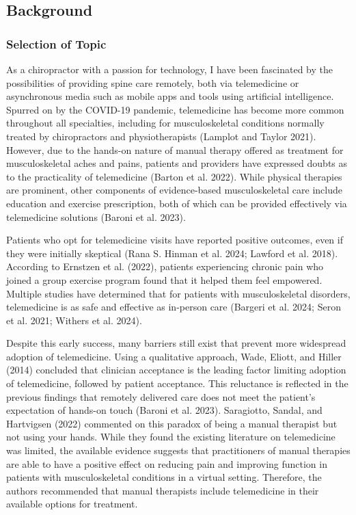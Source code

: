 \documentclass[
  letterpaper,
]{article}
\begin{document}
\subsection{Background}\label{background}

\subsubsection{Selection of Topic}\label{selection-of-topic}

As a chiropractor with a passion for technology, I have been fascinated
by the possibilities of providing spine care remotely, both via
telemedicine or asynchronous media such as mobile apps and tools using
artificial intelligence. Spurred on by the COVID-19 pandemic,
telemedicine has become more common throughout all specialties,
including for musculoskeletal conditions normally treated by
chiropractors and physiotherapists (Lamplot and Taylor 2021). However,
due to the hands-on nature of manual therapy offered as treatment for
musculoskeletal aches and pains, patients and providers have expressed
doubts as to the practicality of telemedicine (Barton et al. 2022).
While physical therapies are prominent, other components of
evidence-based musculoskeletal care include education and exercise
prescription, both of which can be provided effectively via telemedicine
solutions (Baroni et al. 2023).

Patients who opt for telemedicine visits have reported positive
outcomes, even if they were initially skeptical (Rana S. Hinman et al.
2024; Lawford et al. 2018). According to Ernstzen et al. (2022),
patients experiencing chronic pain who joined a group exercise program
found that it helped them feel empowered. Multiple studies have
determined that for patients with musculoskeletal disorders,
telemedicine is as safe and effective as in-person care (Bargeri et al.
2024; Seron et al. 2021; Withers et al. 2024).

Despite this early success, many barriers still exist that prevent more
widespread adoption of telemedicine. Using a qualitative approach, Wade,
Eliott, and Hiller (2014) concluded that clinician acceptance is the
leading factor limiting adoption of telemedicine, followed by patient
acceptance. This reluctance is reflected in the previous findings that
remotely delivered care does not meet the patient's expectation of
hands-on touch (Baroni et al. 2023). Saragiotto, Sandal, and Hartvigsen
(2022) commented on this paradox of being a manual therapist but not
using your hands. While they found the existing literature on
telemedicine was limited, the available evidence suggests that
practitioners of manual therapies are able to have a positive effect on
reducing pain and improving function in patients with musculoskeletal
conditions in a virtual setting. Therefore, the authors recommended that
manual therapists include telemedicine in their available options for
treatment.
\end{document}
